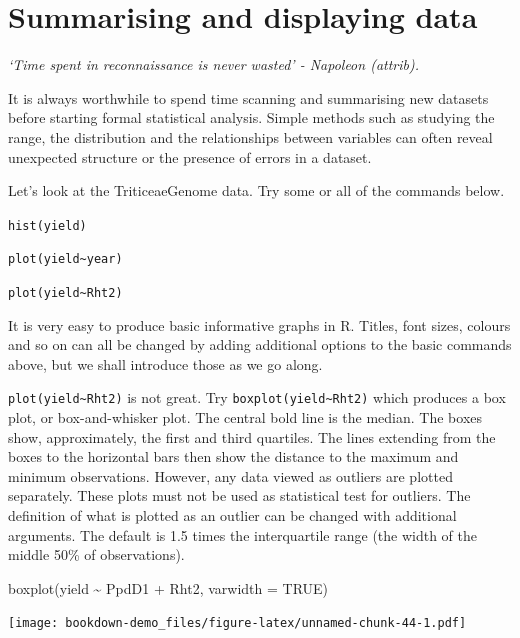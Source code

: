 \documentclass[
]{book}
\newenvironment{Shaded}{\begin{snugshade}}{\end{snugshade}}
\newcommand{\AttributeTok}[1]{\textcolor[rgb]{0.77,0.63,0.00}{#1}}
\newcommand{\ConstantTok}[1]{\textcolor[rgb]{0.00,0.00,0.00}{#1}}
\newcommand{\FunctionTok}[1]{\textcolor[rgb]{0.00,0.00,0.00}{#1}}
\newcommand{\NormalTok}[1]{#1}
\newcommand{\SpecialCharTok}[1]{\textcolor[rgb]{0.00,0.00,0.00}{#1}}
\begin{document}
\hypertarget{summarising-and-displaying-data}{%
\section{Summarising and displaying data}\label{summarising-and-displaying-data}}

\emph{`Time spent in reconnaissance is never wasted' - Napoleon (attrib).}

It is always worthwhile to spend time scanning and summarising new datasets before starting formal statistical analysis. Simple methods such as studying the range, the distribution and the relationships between variables can often reveal unexpected structure or the presence of errors in a dataset.

Let's look at the TriticeaeGenome data. Try some or all of the commands below.

\texttt{hist(yield)}

\texttt{plot(yield\textasciitilde{}year)}

\texttt{plot(yield\textasciitilde{}Rht2)}

It is very easy to produce basic informative graphs in R. Titles, font sizes, colours and so on can all be changed by adding additional options to the basic commands above, but we shall introduce those as we go along.

\texttt{plot(yield\textasciitilde{}Rht2)} is not great. Try \texttt{boxplot(yield\textasciitilde{}Rht2)} which produces a box plot, or box-and-whisker plot. The central bold line is the median. The boxes show, approximately, the first and third quartiles. The lines extending from the boxes to the horizontal bars then show the distance to the maximum and minimum observations. However, any data viewed as outliers are plotted separately. These plots must not be used as statistical test for outliers. The definition of what is plotted as an outlier can be changed with additional arguments. The default is 1.5 times the interquartile range (the width of the middle 50\% of observations).

\begin{Shaded}
\begin{Highlighting}[]
\FunctionTok{boxplot}\NormalTok{(yield }\SpecialCharTok{\textasciitilde{}}\NormalTok{ PpdD1 }\SpecialCharTok{+}\NormalTok{ Rht2, }\AttributeTok{varwidth =} \ConstantTok{TRUE}\NormalTok{)}
\end{Highlighting}
\end{Shaded}

\texttt{[image: bookdown-demo\_files/figure-latex/unnamed-chunk-44-1.pdf]}
\end{document}
